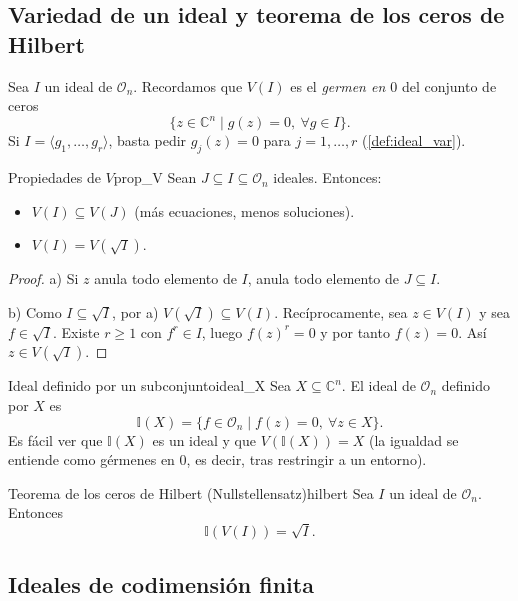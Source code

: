 \documentclass[11pt,a4paper]{article}
\begin{document}
\subsection*{Variedad de un ideal y teorema de los ceros de Hilbert}

Sea $I$ un ideal de $\mathcal{O}_n$. Recordamos que $V(I)$ es el \emph{germen en $0$} del conjunto de ceros
$$ \{ z \in \mathbb{C}^n \mid g(z) = 0,\ \forall g \in I \}. $$
Si $I = \langle g_1, \dots, g_r \rangle$, basta pedir $g_j(z) = 0$ para $j = 1, \dots, r$ (\cref{def:ideal_var}).

\begin{proposicion}{Propiedades de $V$}{prop_V}
Sean $J \subseteq I \subseteq \mathcal{O}_n$ ideales. Entonces:
\begin{itemize}
    \item[a)] $V(I) \subseteq V(J)$ (más ecuaciones, menos soluciones).
    \item[b)] $V(I) = V(\sqrt{I})$.
\end{itemize}
\end{proposicion}
\begin{proof}
a) Si $z$ anula todo elemento de $I$, anula todo elemento de $J \subseteq I$.

b) Como $I \subseteq \sqrt{I}$, por a) $V(\sqrt{I}) \subseteq V(I)$. Recíprocamente, sea $z \in V(I)$ y sea $f \in \sqrt{I}$. Existe $r \ge 1$ con $f^r \in I$, luego $f(z)^r = 0$ y por tanto $f(z) = 0$. Así $z \in V(\sqrt{I})$.
\end{proof}

\begin{definicion}{Ideal definido por un subconjunto}{ideal_X}
Sea $X \subseteq \mathbb{C}^n$. El ideal de $\mathcal{O}_n$ definido por $X$ es
$$ \mathbb{I}(X) = \{ f \in \mathcal{O}_n \mid f(z) = 0,\ \forall z \in X \}. $$
Es fácil ver que $\mathbb{I}(X)$ es un ideal y que $V(\mathbb{I}(X)) = X$ (la igualdad se entiende como gérmenes en $0$, es decir, tras restringir a un entorno).
\end{definicion}

\begin{teorema}{Teorema de los ceros de Hilbert (Nullstellensatz)}{hilbert}
Sea $I$ un ideal de $\mathcal{O}_n$. Entonces
$$ \mathbb{I}(V(I)) = \sqrt{I}. $$
\end{teorema}

\subsection*{Ideales de codimensión finita}
\end{document}
